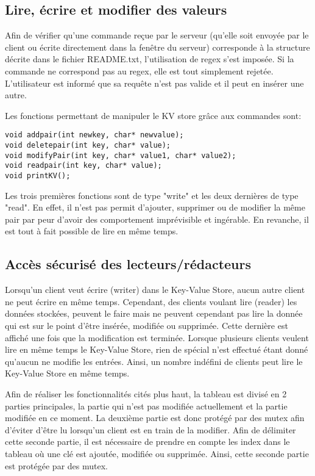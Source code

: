 \documentclass[11pt,a4paper]{article}
\begin{document}
\subsection{Lire, écrire et modifier des valeurs}
Afin de vérifier qu'une commande reçue par le serveur (qu'elle soit envoyée par le client ou écrite directement dans la fenêtre du serveur) corresponde à la structure décrite dans le fichier README.txt, l'utilisation de regex s'est imposée. Si la commande ne correspond pas au regex, elle est tout simplement rejetée. L'utilisateur est informé que sa requête n'est pas valide et il peut en insérer une autre.

Les fonctions permettant de manipuler le KV store grâce aux commandes sont:
\begin{lstlisting}
void addpair(int newkey, char* newvalue);
void deletepair(int key, char* value);
void modifyPair(int key, char* value1, char* value2);
void readpair(int key, char* value);
void printKV();
\end{lstlisting}
Les trois premières fonctions sont de type "write" et les deux dernières de type "read". En effet, il n'est pas permit d'ajouter, supprimer ou de modifier la même pair par peur d'avoir des comportement imprévisible et ingérable. En revanche, il est tout à fait possible de lire en même temps.\\


\subsection{Accès sécurisé des lecteurs/rédacteurs}
Lorsqu'un client veut écrire (writer) dans le Key-Value Store, aucun autre client ne peut écrire en même temps. Cependant, des clients voulant lire (reader) les données stockées, peuvent le faire mais ne peuvent cependant pas lire la donnée qui est sur le point d'être insérée, modifiée ou supprimée. Cette dernière est affiché une fois que la modification est terminée. Lorsque plusieurs clients veulent lire en même temps le Key-Value Store, rien de spécial n'est effectué étant donné qu'aucun ne modifie les entrées. Ainsi, un nombre indéfini de clients peut lire le Key-Value Store en même temps.

Afin de réaliser les fonctionnalités cités plus haut, la tableau est divisé en 2 parties principales, la partie qui n'est pas modifiée actuellement et la partie modifiée en ce moment. La deuxième partie est donc protégé par des mutex afin d'éviter d'être lu lorsqu'un client est en train de la modifier. Afin de délimiter cette seconde partie, il est nécessaire de prendre en compte les index dans le tableau où une clé est ajoutée, modifiée ou supprimée. Ainsi, cette seconde partie est protégée par des mutex. 
\end{document}
